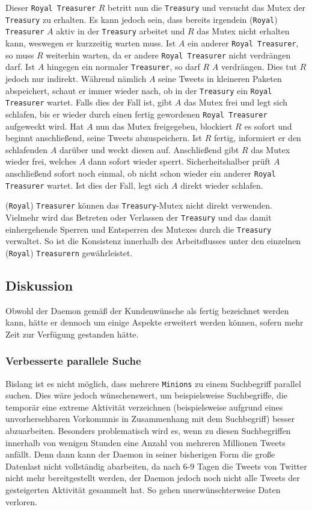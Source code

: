 Dieser \texttt{Royal Treasurer} $R$ betritt nun die \texttt{Treasury} und versucht das Mutex der \texttt{Treasury} zu erhalten.
Es kann jedoch sein, dass bereits irgendein (\texttt{Royal}) \texttt{Treasurer} $A$ aktiv in der \texttt{Treasury} arbeitet und $R$ das Mutex nicht erhalten kann, weswegen er kurzzeitig warten muss.
Ist $A$ ein anderer \texttt{Royal Treasurer}, so muss $R$ weiterhin warten, da er andere \texttt{Royal Treasurer} nicht verdrängen darf.
Ist $A$ hingegen ein normaler \texttt{Treasurer}, so darf $R$ $A$ verdrängen.
Dies tut $R$ jedoch nur indirekt.
Während nämlich $A$ seine Tweets in kleineren Paketen abspeichert, schaut er immer wieder nach, ob in der \texttt{Treasury} ein \texttt{Royal Treasurer} wartet.
Falls dies der Fall ist, gibt $A$ das Mutex frei und legt sich schlafen, bis er wieder durch einen fertig gewordenen \texttt{Royal Treasurer} aufgeweckt wird.
Hat $A$ nun das Mutex freigegeben, blockiert $R$ es sofort und beginnt anschließend, seine Tweets abzuspeichern.
Ist $R$ fertig, informiert er den schlafenden $A$ darüber und weckt diesen auf.
Anschließend gibt $R$ das Mutex wieder frei, welches $A$ dann sofort wieder sperrt.
Sicherheitshalber prüft $A$ anschließend sofort noch einmal, ob nicht schon wieder ein anderer \texttt{Royal Treasurer} wartet.
Ist dies der Fall, legt sich $A$ direkt wieder schlafen.

(\texttt{Royal}) \texttt{Treasurer} können das \texttt{Treasury}-Mutex nicht direkt verwenden. Vielmehr wird das Betreten oder Verlassen der \texttt{Treasury} und das damit einhergehende Sperren und Entsperren des Mutexes durch die \texttt{Treasury} verwaltet.
So ist die Konsistenz innerhalb des Arbeitsflusses unter den einzelnen (\texttt{Royal}) \texttt{Treasurern} gewährleistet.

\subsection{Diskussion}
\label{ssection:ausblick}
Obwohl der Daemon gemäß der Kundenwünsche als fertig bezeichnet werden kann, hätte er dennoch um einige Aspekte erweitert werden können, sofern mehr Zeit zur Verfügung gestanden hätte.

\subsubsection{Verbesserte parallele Suche}

Bislang ist es nicht möglich, dass mehrere \texttt{Minions} zu einem Suchbegriff parallel suchen.
Dies wäre jedoch wünschenswert, um beispielsweise Suchbegriffe, die temporär eine extreme Aktivität verzeichnen (beispielsweise aufgrund eines unvorhersehbaren Vorkommnis in Zusammenhang mit dem Suchbegriff) besser abzuarbeiten.
Besonders problematisch wird es, wenn zu diesen Suchbegriffen innerhalb von wenigen Stunden eine Anzahl von mehreren Millionen Tweets anfällt.
Denn dann kann der Daemon in seiner bisherigen Form die große Datenlast nicht vollständig abarbeiten, da nach 6-9 Tagen die Tweets von Twitter nicht mehr bereitgestellt werden, der Daemon jedoch noch nicht alle Tweets der gesteigerten Aktivität gesammelt hat.
So gehen unerwünschterweise Daten verloren.

